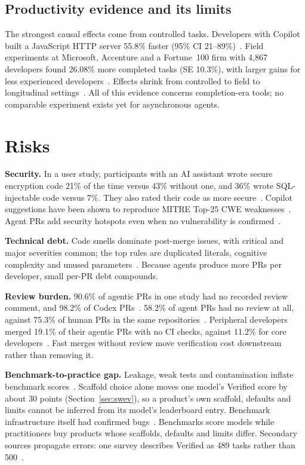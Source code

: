 \documentclass[conference]{IEEEtran}
\begin{document}
\subsection{Productivity evidence and its limits}
The strongest causal effects come from controlled tasks. Developers with Copilot built a JavaScript HTTP
server 55.8\% faster (95\% CI 21--89\%)~\cite{peng2023copilot}. Field experiments at Microsoft, Accenture and
a Fortune~100 firm with 4,867 developers found 26.08\% more completed tasks (SE 10.3\%), with larger gains
for less experienced developers~\cite{cui2025effects}. Effects shrink from controlled to field to
longitudinal settings~\cite{bhati2026}. All of this evidence concerns completion-era tools; no comparable
experiment exists yet for asynchronous agents.

\section{Risks}\label{sec:risks}

\textbf{Security.} In a user study, participants with an AI assistant wrote secure encryption code 21\% of
the time versus 43\% without one, and 36\% wrote SQL-injectable code versus 7\%. They also rated their code
as more secure~\cite{perry2023insecure}. Copilot suggestions have been shown to reproduce MITRE Top-25 CWE
weaknesses~\cite{pearce2025asleep}. Agent PRs add security hotspots even when no vulnerability is
confirmed~\cite{cynthia2026postmerge}.

\textbf{Technical debt.} Code smells dominate post-merge issues, with critical and major severities common;
the top rules are duplicated literals, cognitive complexity and unused parameters~\cite{cynthia2026postmerge}.
Because agents produce more PRs per developer, small per-PR debt compounds.

\textbf{Review burden.} 90.6\% of agentic PRs in one study had no recorded review comment, and 98.2\% of
Codex PRs~\cite{rahman2026}. 58.2\% of agent PRs had no review at all, against 75.3\% of human PRs in the
same repositories~\cite{li2025teammates}. Peripheral developers merged 19.1\% of their agentic PRs with no CI
checks, against 11.2\% for core developers~\cite{cynthia2026core}. Fast merges without review move
verification cost downstream rather than removing it.

\textbf{Benchmark-to-practice gap.} Leakage, weak tests and contamination inflate benchmark
scores~\cite{aleithan2024swebenchplus}. Scaffold choice alone moves one model's Verified score by about
30 points (Section~\ref{sec:swev}), so a product's own scaffold, defaults and limits cannot be inferred
from its model's leaderboard entry. Benchmark infrastructure itself had confirmed bugs~\cite{chen2026beyond}.
Benchmarks score models while practitioners buy products whose scaffolds, defaults and limits differ.
Secondary sources propagate errors: one survey describes Verified as 489 tasks rather than
500~\cite{bhati2026,openai2024verified}.
\end{document}
